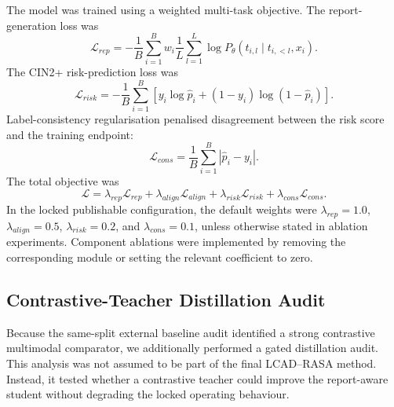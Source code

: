 The model was trained using a weighted multi-task objective. The report-generation loss was
\begin{equation}
\mathcal{L}_{rep}
=
-\frac{1}{B}\sum_{i=1}^{B}
w_i
\frac{1}{L}
\sum_{l=1}^{L}
\log P_{\theta}(t_{i,l}\mid t_{i,<l},x_i).
\end{equation}
The CIN2+ risk-prediction loss was
\begin{equation}
\mathcal{L}_{risk}
=
-\frac{1}{B}
\sum_{i=1}^{B}
\left[
y_i\log\hat{p}_i+(1-y_i)\log(1-\hat{p}_i)
\right].
\end{equation}
Label-consistency regularisation penalised disagreement between the risk score and the training endpoint:
\begin{equation}
\mathcal{L}_{cons}
=
\frac{1}{B}\sum_{i=1}^{B}|\hat{p}_i-y_i|.
\end{equation}
The total objective was
\begin{equation}
\mathcal{L}
=
\lambda_{rep}\mathcal{L}_{rep}
+
\lambda_{align}\mathcal{L}_{align}
+
\lambda_{risk}\mathcal{L}_{risk}
+
\lambda_{cons}\mathcal{L}_{cons}.
\end{equation}
In the locked publishable configuration, the default weights were \(\lambda_{rep}=1.0\), \(\lambda_{align}=0.5\), \(\lambda_{risk}=0.2\), and \(\lambda_{cons}=0.1\), unless otherwise stated in ablation experiments. Component ablations were implemented by removing the corresponding module or setting the relevant coefficient to zero.

\subsection{Contrastive-Teacher Distillation Audit}
\label{subsec:methods_distillation}

Because the same-split external baseline audit identified a strong contrastive multimodal comparator, we additionally performed a gated distillation audit. This analysis was not assumed to be part of the final LCAD--RASA method. Instead, it tested whether a contrastive teacher could improve the report-aware student without degrading the locked operating behaviour.

